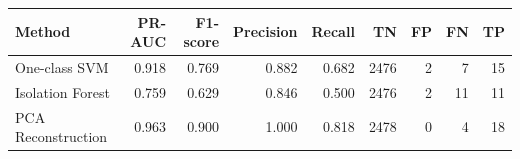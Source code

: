\begin{tabular}{lrrrrrrrr}
\toprule
Method & PR-AUC & F1-score & Precision & Recall & TN & FP & FN & TP \\
\midrule
One-class SVM & 0.918 & 0.769 & 0.882 & 0.682 & 2476 & 2 & 7 & 15 \\
Isolation Forest & 0.759 & 0.629 & 0.846 & 0.500 & 2476 & 2 & 11 & 11 \\
PCA Reconstruction & 0.963 & 0.900 & 1.000 & 0.818 & 2478 & 0 & 4 & 18 \\
\bottomrule
\end{tabular}

